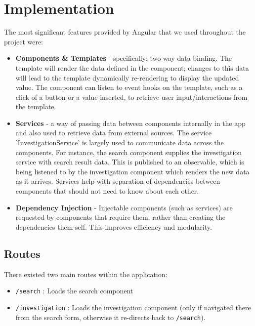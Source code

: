 \section{Implementation}
The most significant features provided by Angular that we used throughout the project were:
\begin{itemize}
    \item \textbf{Components \& Templates} - specifically: two-way data binding. The template will render the data defined in the component; changes to this data will lead to the template dynamically re-rendering to display the updated value. The component can listen to event hooks on the template, such as a click of a button or a value inserted, to retrieve user input/interactions from the template.
    \item \textbf{Services} - a way of passing data between components internally in the app and also used to retrieve data from external sources. The service 'InvestigationService' is largely used to communicate data across the components. For instance, the search component supplies the investigation service with search result data. This is published to an observable, which is being listened to by the investigation component which renders the new data as it arrives. Services help with separation of dependencies between components that should not need to know about each other. 
    \item \textbf{Dependency Injection} - Injectable components (such as services) are requested by components that require them, rather than creating the dependencies them-self. This improves efficiency and modularity. 
\end{itemize}

\subsection{Routes}
There existed two main routes within the application:
\begin{itemize}
    \item \texttt{/search} : Loads the search component
    \item\texttt{/investigation} : Loads the investigation component (only if navigated there from the search form, otherwise it re-directs back to \texttt{/search}).
\end{itemize}

